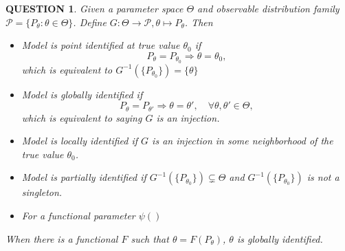 \documentclass[12pt]{article}
\renewcommand{\(}{\left(}%
\renewcommand{\)}{\right)}%
\renewcommand{\[}{\left[}%
\renewcommand{\]}{\right]}%
\newtheorem{question}{QUESTION}[section]}
\begin{document}
\begin{question}
	Given a parameter space $\Theta$ and observable distribution family $\mathcal{P}=\{P_\theta:\theta\in\Theta\}$. Define $G:\Theta\to \mathcal{P},\theta\mapsto P_\theta$. Then
	\begin{itemize}
		\item Model is point identified at true value $\theta_0$ if
		\begin{equation*}
			P_\theta=P_{\theta_0}\Longrightarrow \theta=\theta_0,
		\end{equation*}
		which is equivalent to $G^{-1}(\{P_{\theta_0}\})=\{\theta\}$
		\item Model is globally identified if 
		\begin{equation*}
			P_\theta=P_{\theta'}\Longrightarrow \theta=\theta',\quad \forall \theta,\theta'\in\Theta,
		\end{equation*} 
		which is equivalent to saying $G$ is an injection.
		\item Model is locally identified if $G$ is an injection in some neighborhood of the true value $\theta_0$.
		\item Model is partially identified if $G^{-1}(\{P_{\theta_0}\})\subsetneq \Theta$ and $G^{-1}(\{P_{\theta_0}\})$ is not a singleton.
		\item For a functional parameter $\psi()$
	\end{itemize}
	When there is a functional $F$ such that $\theta=F(P_\theta)$, $\theta$ is globally identified.
\end{question}
\end{document}
